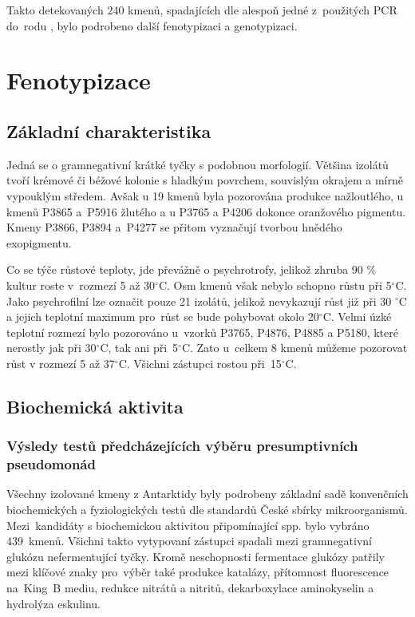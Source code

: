 Takto detekovaných 240 kmenů, spadajících dle alespoň jedné z~použitých PCR do~rodu , bylo podrobeno další fenotypizaci a genotypizaci.

\section{Fenotypizace}
\subsection{Základní charakteristika}
Jedná se o gramnegativní krátké tyčky s podobnou morfologií.
Většina izolátů tvoří krémové či béžové kolonie s hladkým povrchem, souvislým okrajem a mírně vypouklým středem.
Avšak u 19 kmenů byla pozorována produkce nažloutlého, u kmenů P3865 a~P5916 žlutého a u P3765 a P4206 dokonce oranžového pigmentu.
Kmeny P3866, P3894 a~P4277 se přitom vyznačují tvorbou hnědého exopigmentu.

Co se týče růstové teploty, jde převážně o psychrotrofy, jelikož zhruba 90 \% kultur roste v~rozmezí 5 až 30$^\circ$C.
Osm kmenů však nebylo schopno růstu při 5$^\circ$C.
Jako psychrofilní lze označit pouze 21 izolátů, jelikož nevykazují růst již při 30 $^\circ$C a jejich teplotní maximum pro~růst se bude pohybovat okolo 20$^\circ$C.
Velmi úzké teplotní rozmezí bylo pozorováno u~vzorků P3765, P4876, P4885 a P5180, které nerostly jak při 30$^\circ$C, tak ani při~5$^\circ$C.
Zato u~celkem 8 kmenů můžeme pozorovat růst v rozmezí 5 až 37$^\circ$C.
Všichni zástupci rostou při~15$^\circ$C.


\subsection{Biochemická aktivita}
\subsubsection{Výsledy testů předcházejících výběru presumptivních pseudomonád}
Všechny izolované kmeny z Antarktidy byly podrobeny základní sadě konvenčních biochemických a fyziologických testů dle standardů České sbírky mikroorganismů.
Mezi~kandidáty s biochemickou aktivitou připomínající  spp. bylo vybráno 439~kmenů.
Všichni takto vytypovaní zástupci spadali mezi gramnegativní glukózu nefermentující tyčky.
Kromě neschopnosti fermentace glukózy patřily mezi klíčové znaky pro~výběr také produkce katalázy, přítomnost fluorescence na~King~B mediu, redukce nitrátů a nitritů, dekarboxylace aminokyselin a hydrolýza eskulinu.

